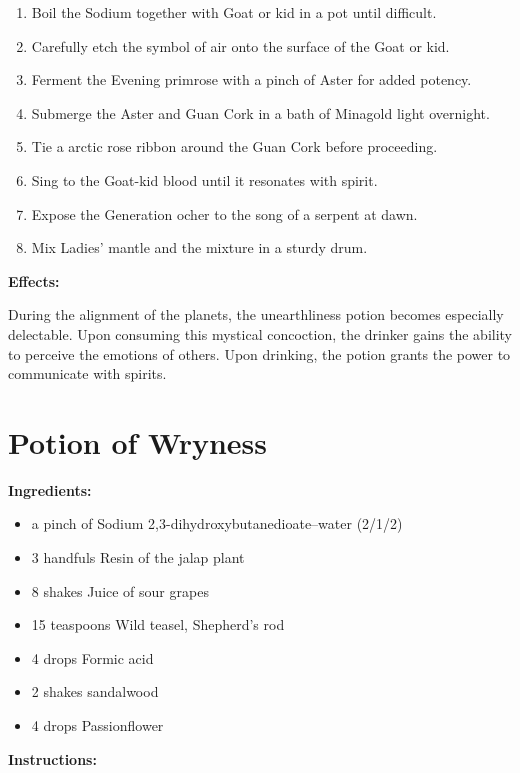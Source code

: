 \documentclass{article}
\begin{document}
\begin{enumerate}
  \item Boil the Sodium together with Goat or kid in a pot until difficult.
  \item Carefully etch the symbol of air onto the surface of the Goat or kid.
  \item Ferment the Evening primrose with a pinch of Aster for added potency.
  \item Submerge the Aster and Guan Cork in a bath of Minagold light overnight.
  \item Tie a arctic rose ribbon around the Guan Cork before proceeding.
  \item Sing to the Goat-kid blood until it resonates with spirit.
  \item Expose the Generation ocher to the song of a serpent at dawn.
  \item Mix Ladies' mantle and the mixture in a sturdy drum.
\end{enumerate}

\textbf{Effects:}

During the alignment of the planets, the unearthliness potion becomes especially delectable. Upon consuming this mystical concoction, the drinker gains the ability to perceive the emotions of others. Upon drinking, the potion grants the power to communicate with spirits.

\newpage
\section*{Potion of Wryness}

\textbf{Ingredients:}

\begin{itemize}
  \item a pinch of Sodium 2,3-dihydroxybutanedioate--water (2/1/2)
  \item 3 handfuls Resin of the jalap plant
  \item 8 shakes Juice of sour grapes
  \item 15 teaspoons Wild teasel, Shepherd's rod
  \item 4 drops Formic acid
  \item 2 shakes sandalwood
  \item 4 drops Passionflower
\end{itemize}

\textbf{Instructions:}
\end{document}
